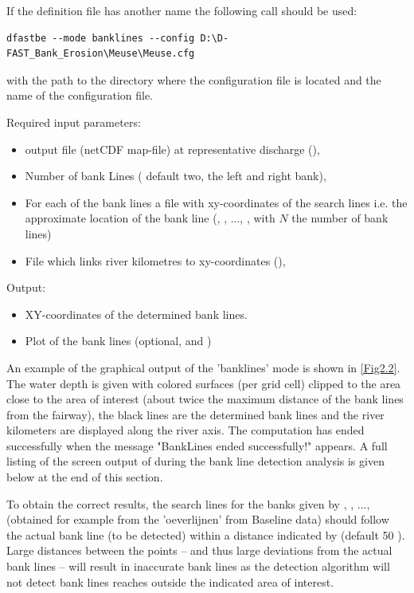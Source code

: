 If the definition file has another name the following call should be used:

\begin{Verbatim}
dfastbe --mode banklines --config D:\D-FAST_Bank_Erosion\Meuse\Meuse.cfg
\end{Verbatim}

with  the path to the directory where the configuration file is located and  the name of the configuration file.

Required input parameters:

\begin{itemize}
\item \dflowfm output file (netCDF map-file) at representative discharge (),
\item Number of bank Lines ( default two, the left and right bank),
\item For each of the bank lines a file with xy-coordinates of the search lines i.e. the approximate location of the bank line (, , ..., , with $N$ the number of bank lines)
\item File which links river kilometres to xy-coordinates (),
\end{itemize}

Output:

\begin{itemize}
\item XY-coordinates of the determined bank lines.
\item Plot of the bank lines (optional,  and )
\end{itemize}

An example of the graphical output of the 'banklines' mode is shown in \autoref{Fig2.2}.
The water depth is given with colored surfaces (per grid cell) clipped to the area close to the area of interest (about twice the maximum distance of the bank lines from the fairway), the black lines are the determined bank lines and the river kilometers are displayed along the river axis.
The computation has ended successfully when the message "BankLines ended successfully!" appears.
A full listing of the screen output of \dfastbe during the bank line detection analysis is given below at the end of this section.

\Note To obtain the correct results, the search lines for the banks given by , , ...,  (obtained for example from the 'oeverlijnen' from Baseline data) should follow the actual bank line (to be detected) within a distance indicated by  (default 50 ).
Large distances between the points -- and thus large deviations from the actual bank lines -- will result in inaccurate bank lines as the detection algorithm will not detect bank lines reaches outside the indicated area of interest.


